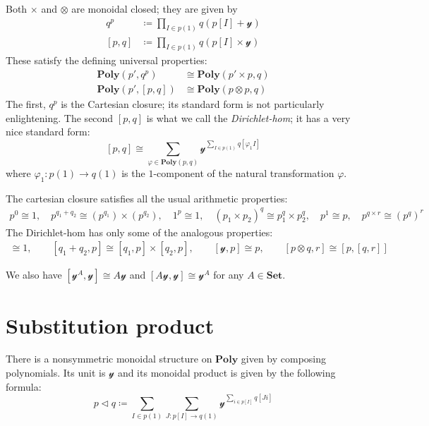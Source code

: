 \documentclass[11pt, one side, article]{memoir}
\theoremstyle{definition}
\theoremstyle{plain}
\newcommand{\Cat}[1]{\mathbf{#1}}%
\newcommand{\smset}{\Cat{Set}}
\newcommand{\yon}{\mathcal{y}}
\newcommand{\poly}{\Cat{Poly}}
\newcommand{\0}{\textsf{0}}
\newcommand{\1}{\tn{\textsf{1}}}
\newcommand{\tri}{\mathbin{\triangleleft}}
\begin{document}
Both $\times$ and $\otimes$ are monoidal closed; they are given by
\begin{align}
  q^p&\coloneqq \prod_{I\in p(1)}q(p[I]+\yon)\\
  [p,q]&\coloneqq\prod_{I\in p(1)}q(p[I]\times\yon)
\end{align}
These satisfy the defining universal properties:
\begin{align}
  \poly(p',q^p)&\cong\poly(p'\times p,q)\\
  \poly(p',[p,q])&\cong\poly(p\otimes p,q)
\end{align}
The first, $q^p$ is the Cartesian closure; its standard form is not particularly enlightening. The second $[p,q]$ is what we call the \emph{Dirichlet-hom}; it has a very nice standard form:
\[
[p,q]\cong\sum_{\varphi\in\poly(p,q)}\yon^{\sum\limits_{I\in p(1)}q[\varphi_1I]}
\]
where $\varphi_1\colon p(1)\to q(1)$ is the $1$-component of the natural transformation $\varphi$.

The cartesian closure satisfies all the usual arithmetic properties:
\begin{gather}
	p^0\cong1,\quad
	p^{q_1+q_2}\cong (p^{q_1})\times(p^{q_2}),\quad
	1^p\cong 1,\quad
	(p_1\times p_2)^q\cong p_1^q\times p_2^q,\quad
	p^1\cong p,\quad
	p^{q\times r}\cong (p^q)^r
\end{gather}
The Dirichlet-hom has only some of the analogous properties:
\begin{gather}
	[0,p]\cong1,\qquad
	[q_1+q_2,p]\cong [q_1,p]\times[q_2,p],\qquad
	[\yon,p]\cong p,\qquad
	[p\otimes q,r]\cong[p,[q,r]]
\end{gather}

We also have $[\yon^A,\yon]\cong A\yon$ and $[A\yon,\yon]\cong\yon^A$ for any $A\in\smset$.


\chapter{Substitution product}

There is a nonsymmetric monoidal structure on $\poly$ given by composing polynomials. Its unit is $\yon$ and its monoidal product is given by the following formula:
\begin{equation}
p\tri q\coloneqq\sum_{I\in p(1)}\sum_{J\colon p[I]\to q(1)}\yon^{\sum\limits_{i\in p[I]}q[Ji]}
\end{equation}
\end{document}
